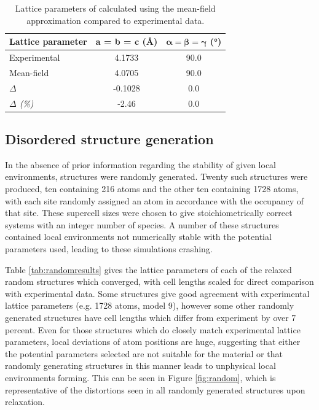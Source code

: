 \newcommand{\tableline}{\multicolumn{1}{c}{--}}
\newcommand{\tableliner}{\multicolumn{1}{c}{{\color{red}--}}}
\newcommand{\mc}[1]{\multicolumn{1}{c}{#1}}

\begin{table}[h]
\centering
\caption{Lattice parameters of  calculated using the mean-field approximation compared to experimental data.}
\begin{tabular}{lS[table-format=1.4]S[table-format=2.1]}
\toprule
\textbf{Lattice parameter} &\mc{\textbf{a} = \textbf{b} = \textbf{c} (\AA)} & \mc{$\boldsymbol{\alpha} = \boldsymbol{\beta} = \boldsymbol{\gamma}$ (\si{\degree})}\\
\midrule
Experimental \cite{Freire2016} &  4.1733  & 90.0 \\
Mean-field                     &  4.0705  & 90.0 \\ 
\textit{$\Delta$}              & -0.1028  & 0.0  \\
\textit{$\Delta$ (\%)}         & -2.46    & 0.0  \\\bottomrule
\end{tabular}
\label{tab:lattice}
\end{table}
\newpage

\subsection{Disordered structure generation}
In the absence of prior information regarding the stability of given local environments, structures were randomly generated.
Twenty such structures were produced, ten containing 216 atoms and the other ten containing 1728 atoms, with each site randomly assigned an atom in accordance with the occupancy of that site.
These supercell sizes were chosen to give stoichiometrically correct systems with an integer number of species.
A number of these structures contained local environments not numerically stable with the potential parameters used, leading to these simulations crashing.

Table \ref{tab:randomresults} gives the lattice parameters of each of the relaxed random structures which converged, with cell lengths scaled for direct comparison with experimental data.\cite{Freire2016}
Some structures give good agreement with experimental lattice parameters (e.g. 1728 atoms, model 9), however some other randomly generated structures have cell lengths which differ from experiment by over 7 percent.
Even for those structures which do closely match experimental lattice parameters, local deviations of atom positions are huge, suggesting that either the potential parameters selected are not suitable for the material or that randomly generating structures in this manner leads to unphysical local environments forming. This can be seen in Figure \ref{fig:random}, which is representative of the distortions seen in all randomly generated structures upon relaxation.

